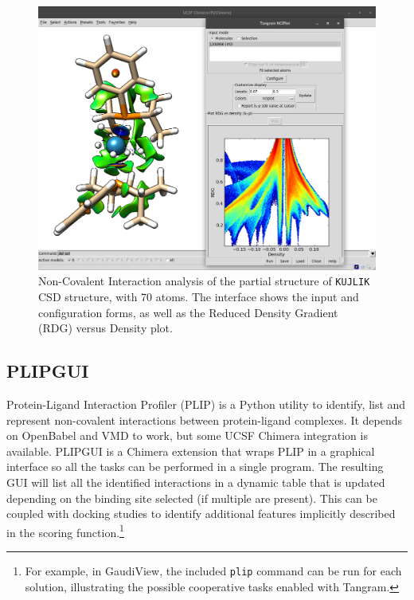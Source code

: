 \begin{figure}
	\begin{Center}
		\includegraphics[width=\textwidth]{./figures/05/tangram_nciplot.png}
		\cprotect\caption[Tangram NCIPlotGUI]{Non-Covalent Interaction analysis of the partial structure of \texttt{KUJLIK} CSD structure,\cite{kujlik} with 70 atoms. The interface shows the input and configuration forms, as well as the Reduced Density Gradient (RDG) versus Density plot.}
		\label{fig:tangram-nciplot}
	\end{Center}
\end{figure}

\subsection{PLIPGUI}
Protein-Ligand Interaction Profiler (PLIP)\cite{salentin2015plip} is a Python utility to identify, list and represent non-covalent interactions between protein-ligand complexes. It depends on OpenBabel and VMD to work, but some UCSF Chimera integration is available. PLIPGUI is a Chimera extension that wraps PLIP in a graphical interface so all the tasks can be performed in a single program. The resulting GUI will list all the identified interactions in a dynamic table that is updated depending on the binding site selected (if multiple are present). This can be coupled with docking studies to identify additional features implicitly described in the scoring function.\footnote{For example, in GaudiView, the included \texttt{plip} command can be run for each solution, illustrating the possible cooperative tasks enabled with Tangram.}

